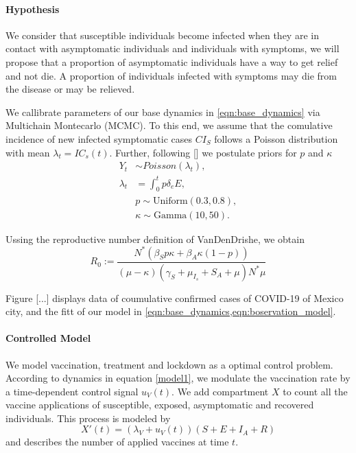 \documentclass[a4paper,10pt]{amsart}
\begin{document}
        \paragraph{Hypothesis} We consider that susceptible individuals become
        infected when they are in contact with asymptomatic individuals and
        individuals with symptoms, we will propose that a proportion of
        asymptomatic individuals have a way to get relief and not die. A
        proportion of individuals infected with symptoms may die from the
        disease or may be relieved.

        	We callibrate parameters of our base dynamics in \eqref{eqn:base_dynamics}
        via Multichain Montecarlo (MCMC). To this end, we assume that the comulative 
        incidence of new infected symptomatic cases $CI_S$ 
        follows a Poisson distribution with mean $\lambda_t = IC_s(t)$. Further,
        following [] we postulate priors for $p$ and $\kappa$
        \begin{equation}
        	\label{eqn:boservation_model}
        	\begin{aligned}
        		Y_t & \sim Poisson(\lambda_t),
        		\\
        		\lambda_t 
        			&=
        			\int_{0}^t p \delta_e E ,
        		\\
        			& p \sim \text{Uniform} (0.3, 0.8),
        		\\
        			& \kappa \sim \text{Gamma}(10, 50).
        	\end{aligned}
        \end{equation}

    Ussing the reproductive number definition of VanDenDrishe, we obtain
	\begin{equation*}
		\label{eqn:reproductive_number}
		R_0 := 
			\frac{
				N^{*}(
					\beta_S p 
					\kappa + 
					\beta_A 
					\kappa(1-p) )
			}{
				(\mu - \kappa)( \gamma_S + \mu_{I_s} + S_A + \mu) 
				N^* \mu
			}
	\end{equation*}


        Figure [...] displays data of coumulative confirmed cases of COVID-19 of
    Mexico city, and the fitt of our model in 
    \cref{eqn:base_dynamics,eqn:boservation_model}.
    
    \paragraph{Controlled Model}
    We model vaccination, treatment and lockdown as a optimal control problem.
     According to dynamics in equation \eqref{model1}, we modulate the vaccination rate by 
a time-dependent control signal  $u_V(t)$. We add  compartment $X$ to count all the vaccine
applications of susceptible, exposed, asymptomatic and
recovered individuals. This process is modeled by
\begin{equation}
    \label{eqn:counter}
      X'(t) =
        (\lambda_V + u_V(t))(S + E + I_A + R)
\end{equation}
and describes the number of applied vaccines at time $t$.
 
\end{document}
